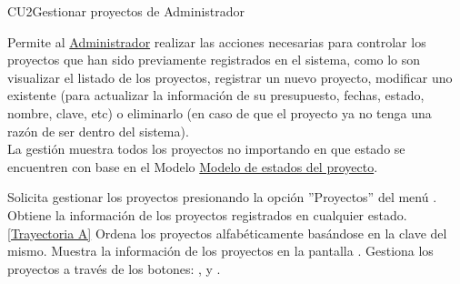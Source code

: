 	\begin{UseCase}{CU2}{Gestionar proyectos de Administrador}{
			
			Permite al \hyperlink{admin}{Administrador} realizar las acciones necesarias para controlar los proyectos que han sido previamente registrados en el sistema, como lo son visualizar el listado de los proyectos, registrar un nuevo proyecto, modificar uno existente (para actualizar la información de su presupuesto, fechas, estado, nombre, clave, etc) o eliminarlo (en caso de que el proyecto ya no tenga una razón de ser dentro del sistema).\\
			La gestión muestra todos los proyectos no importando en que estado se encuentren con base en el Modelo \hyperlink{edoProy}{Modelo de estados del proyecto}.
				
	}
		
	
		
	\end{UseCase}
	\begin{UCtrayectoria}
		\UCpaso[\UCactor] Solicita gestionar los proyectos presionando la opción ''Proyectos'' del menú .
		\UCpaso[\UCsist] Obtiene la información de los proyectos registrados en cualquier estado. \hyperlink{CU2:TAA}{[Trayectoria A]}
		\UCpaso[\UCsist] Ordena los proyectos alfabéticamente basándose en la clave del mismo.
		\UCpaso[\UCsist] Muestra la información de los proyectos en la pantalla . \label{GP-P3}
		\UCpaso[\UCactor] Gestiona los proyectos a través de los botones: , \editar  y \eliminar. 
	\end{UCtrayectoria}		

